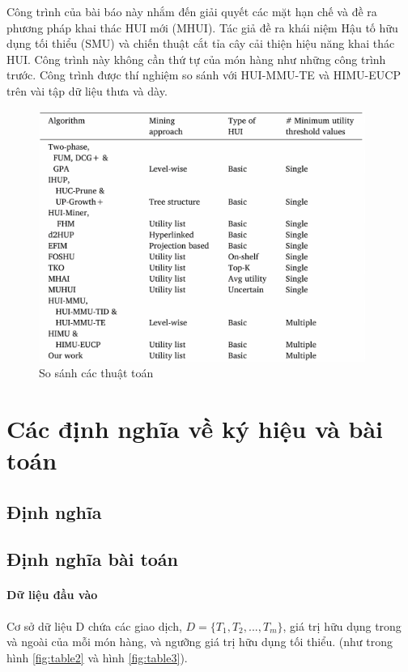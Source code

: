 Công trình của bài báo này nhắm đến giải quyết các mặt hạn chế và đề ra phương pháp khai thác HUI mới (MHUI). Tác giả đề ra khái niệm Hậu tố hữu dụng tối thiểu (SMU) và chiến thuật cắt tỉa cây cải thiện hiệu năng khai thác HUI. Công trình này không cần thứ tự của món hàng như những công trình trước. Công trình được thí nghiệm so sánh với HUI-MMU-TE \cite{lin2016cefficient} và HIMU-EUCP \cite{gan2016more} trên vài tập dữ liệu thưa và dày. 


\begin{figure}[h]
\centering
\includegraphics[width=0.95\textwidth]{image/table/table1-boring.jpg}
\caption{\label{figtable1} So sánh các thuật toán}
\end{figure}

\section{Các định nghĩa về ký hiệu và bài toán}

\subsection{Định nghĩa} \label{sec:def}
 

\subsection{Định nghĩa bài toán}

\paragraph{Dữ liệu đầu vào} Cơ sở dữ liệu D chứa các giao dịch, $D = \{T_1, T_2, ..., T_m\}$, giá trị hữu dụng trong và ngoài của mỗi món hàng, và ngưỡng giá trị hữu dụng tối thiểu. (như trong hình \ref{fig:table2} và hình \ref{fig:table3}).

